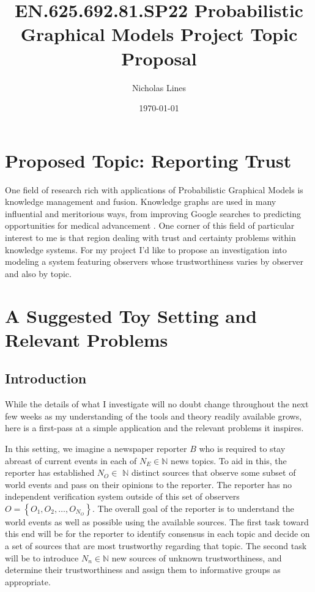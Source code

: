 \documentclass{amsart}
\theoremstyle{definition}
\theoremstyle{plain}
\numberwithin{equation}{section}
\begin{document}
\title[Topic]{EN.625.692.81.SP22 Probabilistic Graphical Models Project
Topic Proposal}
\author{Nicholas Lines}
\date{\today }
\maketitle

\section{Proposed Topic: Reporting Trust}

One field of research rich with applications of Probabilistic Graphical
Models is knowledge management and fusion. Knowledge graphs are used in many
influential and meritorious ways, from improving Google searches to
predicting opportunities for medical advancement \cite%
{koller2009probabilistic}. One corner of this field of particular interest
to me is that region dealing with trust and certainty problems within
knowledge systems. For my project I'd like to propose an investigation into
modeling a system featuring observers whose trustworthiness varies by
observer and also by topic.

\section{A Suggested Toy Setting and Relevant Problems}

\subsection{Introduction}

While the details of what I investigate will no doubt change throughout the
next few weeks as my understanding of the tools and theory readily available
grows, here is a first-pass at a simple application and the relevant
problems it inspires.

In this setting, we imagine a newspaper reporter $B$ who is required to stay
abreast of current events in each of $N_{E}\in \mathbb{N}$ news topics. To
aid in this, the reporter has established $N_{O}\in $ $\mathbb{N}$ distinct
sources that observe some subset of world events and pass on their opinions
to the reporter. The reporter has no independent verification system outside
of this set of observers $O=\left\{ O_{1},O_{2},\dots ,O_{N_{O}}\right\} $.
The overall goal of the reporter is to understand the world events as well
as possible using the available sources. The first task toward this end will
be for the reporter to identify consensus in each topic and decide on a set
of sources that are most trustworthy regarding that topic. The second task
will be to introduce $N_{n}\in \mathbb{N}$ new sources of unknown
trustworthiness, and determine their trustworthiness and assign them to
informative groups as appropriate.
\end{document}
